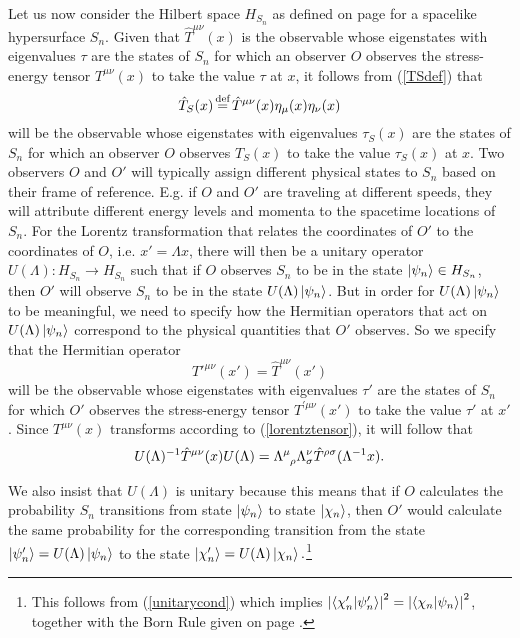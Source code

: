 Let us now consider the Hilbert space $H_{S_n}$ as defined on page \pageref{HSidef} for a spacelike hypersurface $S_n$. 
Given that $\hat{T}^{\mu\nu}(x)$ is the observable whose eigenstates with eigenvalues $\tau$ are the states of $S_n$ for which an observer $O$ observes the stress-energy tensor $T^{\mu\nu}(x)$ to take the value $\tau$ at $x$, it follows from (\ref{TSdef}) that 
\begin{equation}\label{TShat}
	\hat{T}_S(x)\myeq \hat{T}^{\mu\nu}(x)\eta_{\mu}(x)\eta_{\nu}(x)
	\end{equation}
	will be the observable whose eigenstates with eigenvalues $\tau_S(x)$ are the states of $S_n$ for which an observer $O$ observes $T_S(x)$ to take the value $\tau_S(x)$ at $x$.
Two observers $O$ and $O'$ will typically assign different physical states to $S_n$ based on their frame of reference. E.g. if $O$ and $O'$ are traveling at different speeds, they will attribute different energy levels and momenta to the spacetime locations of $S_n$. For the Lorentz transformation that relates the coordinates of $O'$ to the coordinates of $O$, i.e. $x'=\Lambda x$,  there  will then be a unitary operator $U(\Lambda):H_{S_n}\rightarrow H_{S_n}$ such that if
$O$ observes  $S_n$ to be in the state $\ket{\psi_n}\in H_{S_n}$, then $O'$ will observe $S_n$ to be in the state $U(\Lambda)\ket{\psi_n}$. But in order for $U(\Lambda)\ket{\psi_n}$ to be meaningful, we need to specify how the Hermitian operators that act on $U(\Lambda)\ket{\psi_n}$ correspond to the physical quantities that $O'$ observes. So we specify that the Hermitian operator 
\begin{equation}\label{Thatprime}
\hat{T}'^{\mu\nu}(x')=\hat{T}^{\mu\nu}(x')
\end{equation}
will be the observable whose eigenstates with eigenvalues $\tau'$ are the states of $S_n$ for which $O'$ observes the stress-energy tensor $T^{\prime\mu\nu}(x')$ to take the value $\tau'$ at $x'$. Since $T^{\mu\nu}(x)$ transforms according to (\ref{lorentztensor}), it will follow that
\begin{equation}\label{TUrelation}
U(\Lambda)^{-1}\hat{T}^{\mu\nu}(x)U(\Lambda)=\Lambda\indices{^\mu_\rho}\Lambda{^\nu_\sigma}\hat{T}^{\rho\sigma}(\Lambda^{-1}x).
\end{equation}

We also insist that $U(\Lambda)$ is unitary because this means that if $O$ calculates the probability $S_n$ transitions from state $\ket{\psi_n}$ to state $\ket{\chi_n}$, then $O'$ would calculate the same probability for the corresponding transition from the state $\ket{\psi_n'}=U(\Lambda)\ket{\psi_n}$ to the state $\ket{\chi_n'}=U(\Lambda)\ket{\chi_n}.$\footnote{This follows from (\ref{unitarycond}) which implies 
$\abs{\ip{\chi'_n}{\psi'_n}}^2=\abs{\ip{\chi_n}{\psi_n}}^2$, together with the Born Rule given on page \pageref{bornrule}.}

